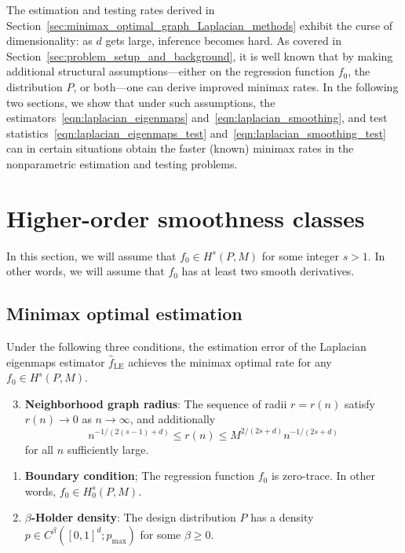 \documentclass{article}
\newcommand{\1}{\mathbf{1}}
\newcommand{\wh}[1]{\widehat{#1}}
\newcommand{\LE}{\mathrm{LE}}
\theoremstyle{alden}
\theoremstyle{aldenthm}
\theoremstyle{definition}
\theoremstyle{remark}
\begin{document}
The estimation and testing rates derived in Section~\ref{sec:minimax_optimal_graph_Laplacian_methods} exhibit the curse of dimensionality: as $d$ gets large, inference becomes hard. As covered in Section~\ref{sec:problem_setup_and_background}, it is well known that by making additional structural assumptions---either on the regression function $f_0$, the distribution $P$, or both---one can derive improved minimax rates. In the following two sections, we show that under such assumptions, the estimators~\eqref{eqn:laplacian_eigenmaps} and~\eqref{eqn:laplacian_smoothing}, and test statistics~\eqref{eqn:laplacian_eigenmaps_test} and~\eqref{eqn:laplacian_smoothing_test} can in certain situations obtain the faster (known) minimax rates in the nonparametric estimation and testing problems.

\section{Higher-order smoothness classes}
\label{sec:higher_order_smoothness_classes}
In this section, we will assume that $f_0 \in H^s(P,M)$ for some integer $s > 1$. In other words, we will assume that $f_0$ has at least two smooth derivatives. 

\subsection{Minimax optimal estimation}
Under the following three conditions, the estimation error of the Laplacian eigenmaps estimator $\wh{f}_{\LE}$ achieves the minimax optimal rate for any $f_0 \in H^s(P,M)$.
\begin{enumerate}[label=(K\arabic*)]
	\setcounter{enumi}{2}
	\item 
	\label{asmp:kernel_radius_higher_order}
	\textbf{Neighborhood graph radius}:
	The sequence of radii $r = r(n)$ satisfy $r(n) \to 0$ as $n \to \infty$, and additionally
	\begin{equation*}
	n^{-1/(2(s - 1) + d)}\leq r(n) \leq M^{2/(2s + d)}n^{-1/(2s + d)}
	\end{equation*}
	for all $n$ sufficiently large.
\end{enumerate}
\begin{enumerate}[label=(F\arabic*)]
	\setcounter{enumi}{0}
	\item 
	\label{asmp:boundary} \textbf{Boundary condition}; The regression function $f_0$ is zero-trace. In other words, $f_0 \in H_0^s(P,M)$. 
\end{enumerate}
\begin{enumerate}[label=(P\arabic*)]
	\setcounter{enumi}{1}
	\item 
	\label{asmp:smooth_density}\textbf{$\beta$-Holder density}: The design distribution $P$ has a density $p \in C^{\beta}([0,1]^d;p_{\max})$ for some $\beta \geq 0$. 
\end{enumerate}
\end{document}
